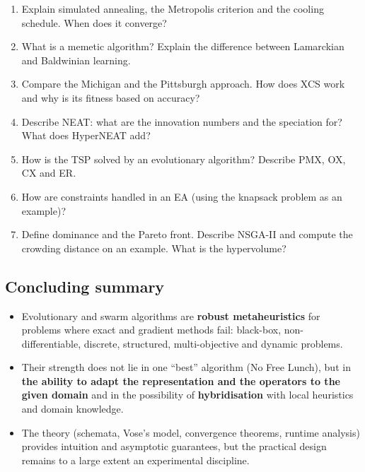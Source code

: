 \documentclass[11pt,a4paper]{article}
\theoremstyle{definition}
\providecommand{\uv}[1]{``#1''}
\begin{document}
\begin{enumerate}
\item Explain simulated annealing, the Metropolis criterion and the cooling
  schedule. When does it converge?
\item What is a memetic algorithm? Explain the difference between Lamarckian and
  Baldwinian learning.
\item Compare the Michigan and the Pittsburgh approach. How does XCS work and
  why is its fitness based on accuracy?
\item Describe NEAT: what are the innovation numbers and the speciation for?
  What does HyperNEAT add?
\item How is the TSP solved by an evolutionary algorithm? Describe PMX, OX, CX
  and ER.
\item How are constraints handled in an EA (using the knapsack problem as an
  example)?
\item Define dominance and the Pareto front. Describe NSGA-II and compute the
  crowding distance on an example. What is the hypervolume?
\end{enumerate}

\subsection*{Concluding summary}

\begin{itemize}
\item Evolutionary and swarm algorithms are \textbf{robust metaheuristics} for
  problems where exact and gradient methods fail: black-box, non-differentiable,
  discrete, structured, multi-objective and dynamic problems.
\item Their strength does not lie in one \uv{best} algorithm (No Free Lunch),
  but in \textbf{the ability to adapt the representation and the operators to
  the given domain} and in the possibility of \textbf{hybridisation} with local
  heuristics and domain knowledge.
\item The theory (schemata, Vose's model, convergence theorems, runtime
  analysis) provides intuition and asymptotic guarantees, but the practical
  design remains to a large extent an experimental discipline.
\end{itemize}
\end{document}
